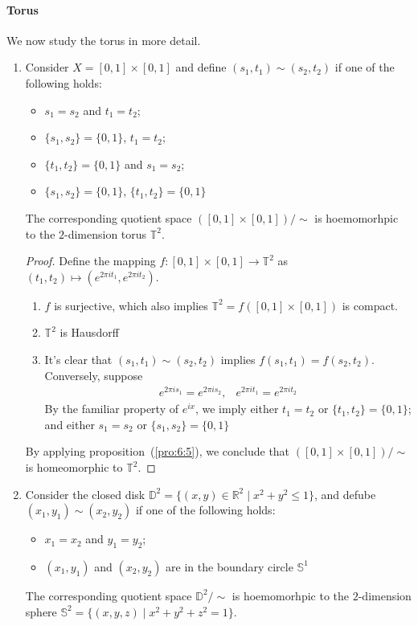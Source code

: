 \paragraph{Torus}
We now study the torus in more detail.
\begin{enumerate}
\item
Consider $X=[0,1]\times[0,1]$ and define $(s_1,t_1)\sim(s_2,t_2)$ if one of the following holds:
\begin{itemize}
\item
$s_1=s_2$ and $t_1=t_2$;
\item
$\{s_1,s_2\}=\{0,1\}$, $t_1=t_2$;
\item
$\{t_1,t_2\}=\{0,1\}$ and $s_1=s_2$;
\item
$\{s_1,s_2\}=\{0,1\}$, $\{t_1,t_2\}=\{0,1\}$
\end{itemize}
The corresponding quotient space $([0,1]\times[0,1])/\sim$ is hoemomorhpic to the $2$-dimension torus $\mathbb{T}^2$.
\begin{proof}
Define the mapping $f:[0,1]\times[0,1]\to\mathbb{T}^2$ as $(t_1,t_2)\mapsto(e^{2\pi i t_1},e^{2\pi i t_2})$. 
\begin{enumerate}
\item
$f$ is surjective, which also implies $\mathbb{T}^2 = f([0,1]\times[0,1])$ is compact.
\item
$\mathbb{T}^2$ is Hausdorff
\item
It's clear that $(s_1,t_1)\sim(s_2,t_2)$ implies $f(s_1,t_1)=f(s_2,t_2)$. Conversely, suppose
\[
\begin{array}{ll}
e^{2\pi i s_1}=e^{2\pi i s_2},
&
e^{2\pi i t_1}=e^{2\pi i t_2}
\end{array}
\]
By the familiar property of $e^{ix}$, we imply either $t_1=t_2$ or $\{t_1,t_2\}=\{0,1\}$; and either $s_1=s_2$ or $\{s_1,s_2\}=\{0,1\}$
\end{enumerate}
By applying proposition~(\ref{pro:6:5}), we conclude that $([0,1]\times[0,1])/\sim$ is homeomorphic to $\mathbb{T}^2$.
\end{proof}
\item
Consider the closed disk $\mathbb{D}^2=\{(x,y)\in\mathbb{R}^2\mid x^2+y^2\le 1\}$,
and defube $(x_1,y_1)\sim(x_2,y_2)$ if one of the following holds:
\begin{itemize}
\item
$x_1=x_2$ and $y_1=y_2$;
\item
$(x_1,y_1)$ and $(x_2,y_2)$ are in the boundary circle $\mathbb{S}^1$
\end{itemize}
The corresponding quotient space $\mathbb{D}^2/\sim$ is hoemomorhpic to the $2$-dimension sphere $\mathbb{S}^2=\{(x,y,z)\mid x^2+y^2+z^2=1\}$.

\end{enumerate}
